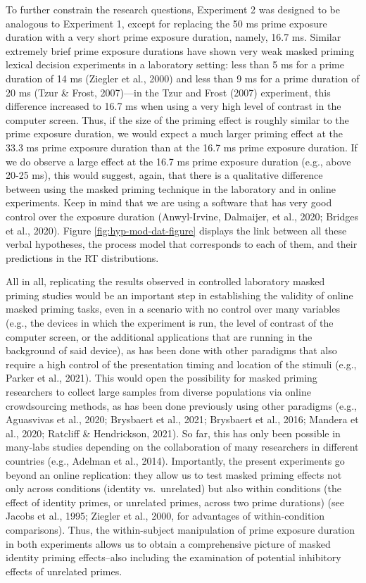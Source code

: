 \documentclass[
  english,
  man,floatsintext]{apa6}
\begin{document}
To further constrain the research questions, Experiment 2 was designed to be analogous to Experiment 1, except for replacing the 50 ms prime exposure duration with a very short prime exposure duration, namely, 16.7 ms. Similar extremely brief prime exposure durations have shown very weak masked priming lexical decision experiments in a laboratory setting: less than 5 ms for a prime duration of 14 ms (Ziegler et al., 2000) and less than 9 ms for a prime duration of 20 ms (Tzur \& Frost, 2007)---in the Tzur and Frost (2007) experiment, this difference increased to 16.7 ms when using a very high level of contrast in the computer screen. Thus, if the size of the priming effect is roughly similar to the prime exposure duration, we would expect a much larger priming effect at the 33.3 ms prime exposure duration than at the 16.7 ms prime exposure duration. If we do observe a large effect at the 16.7 ms prime exposure duration (e.g., above 20-25 ms), this would suggest, again, that there is a qualitative difference between using the masked priming technique in the laboratory and in online experiments. Keep in mind that we are using a software that has very good control over the exposure duration (Anwyl-Irvine, Dalmaijer, et al., 2020; Bridges et al., 2020). Figure \ref{fig:hyp-mod-dat-figure} displays the link between all these verbal hypotheses, the process model that corresponds to each of them, and their predictions in the RT distributions.

All in all, replicating the results observed in controlled laboratory masked priming studies would be an important step in establishing the validity of online masked priming tasks, even in a scenario with no control over many variables (e.g., the devices in which the experiment is run, the level of contrast of the computer screen, or the additional applications that are running in the background of said device), as has been done with other paradigms that also require a high control of the presentation timing and location of the stimuli (e.g., Parker et al., 2021). This would open the possibility for masked priming researchers to collect large samples from diverse populations via online crowdsourcing methods, as has been done previously using other paradigms (e.g., Aguasvivas et al., 2020; Brysbaert et al., 2021; Brysbaert et al., 2016; Mandera et al., 2020; Ratcliff \& Hendrickson, 2021). So far, this has only been possible in many-labs studies depending on the collaboration of many researchers in different countries (e.g., Adelman et al., 2014). Importantly, the present experiments go beyond an online replication: they allow us to test masked priming effects not only across conditions (identity vs.~unrelated) but also within conditions (the effect of identity primes, or unrelated primes, across two prime durations) (see Jacobs et al., 1995; Ziegler et al., 2000, for advantages of within-condition comparisons). Thus, the within-subject manipulation of prime exposure duration in both experiments allows us to obtain a comprehensive picture of masked identity priming effects--also including the examination of potential inhibitory effects of unrelated primes.
\end{document}
